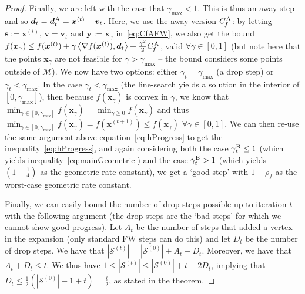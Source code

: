 \documentclass{article} %
\newcommand{\domain}{\mathcal{M}} %
\newcommand{\stepsize}{\gamma}
\newcommand{\stepbound}{\stepsize^\textnormal{\scriptsize B}} %
\newcommand{\away}{{\hspace{0.06em}\textnormal{\scriptsize A}}}
\newcommand{\CfAFW}{C_{\hspace{-0.08em}f}^\away}
\newcommand{\x}{\bm{x}}
\newcommand{\y}{\bm{y}}
\newcommand{\s}{\bm{s}}
\newcommand{\dd}{\bm{d}}
\newcommand{\vv}{\bm{v}} %
\newcommand{\Coreset}{\mathcal{S}}
\newcommand{\0}{\mathbf{0}} %
\begin{document}
\begin{proof}
Finally, we are left with the case that $\stepsize_\textrm{max} < 1$. This is
thus an away step and so $\dd_t = \dd_t^\away = \x^{(t)} - \vv_t$. Here, we
use the away version $\CfAFW$: by letting $\s := \x^{(t)}$, $\vv = \vv_t$ and $\y := \x_\stepsize$ in~\eqref{eq:CfAFW}, we also
get the bound $f(\x_\stepsize) \leq f(\x^{(t)}) + \stepsize \left\langle 
\nabla f(\x^{(t)}), \dd_t \right\rangle + \frac{\stepsize^2}{2} \CfAFW$,
valid $\forall \stepsize \in [0,1]$ (but note here that the points
$\x_\stepsize$ are not feasible for $\stepsize > \stepsize_\textrm{max}$ --
the bound considers some points outside of $\domain$). We now have two
options: either $\stepsize_t = \stepsize_\textrm{max}$ (a drop step) or
$\stepsize_t < \stepsize_\textrm{max}$. In the case $\stepsize_t <
\stepsize_\textrm{max}$ (the line-search yields a solution in the interior of
$[0,\stepsize_\textrm{max}]$), then because $f(\x_\stepsize)$ is convex in
$\stepsize$, we know that $\min_{\stepsize \in [0,\stepsize_\textrm{max}]}
f(\x_\stepsize) = \min_{\stepsize \geq 0} f(\x_\stepsize)$ and thus
$\min_{\stepsize \in [0,\stepsize_\textrm{max}]} f(\x_\stepsize) =
f(\x^{(t+1)}) \leq f(\x_\stepsize)$ $\forall \stepsize \in [0,1]$. We can
then re-use the same argument above equation~\eqref{eq:hProgress} to get the
inequality~\eqref{eq:hProgress}, and again considering both the case
$\stepbound_t \leq 1$ (which yields inequality~\eqref{eq:mainGeometric}) and
the case $\stepbound_t > 1$ (which yields $(1-\frac{1}{4})$ as the geometric
rate constant), we get a `good step' with $1-\rho_f$ as the worst-case
geometric rate constant.

Finally, we can easily bound the number of drop steps possible up to
iteration $t$ with the following argument (the drop steps are the `bad steps'
for which we cannot show good progress). Let $A_t$ be the number of steps
that added a vertex in the expansion (only standard FW steps can do this) and
let $D_t$ be the number of drop steps. We have that $|\Coreset^{(t)}| =
|\Coreset^{(0)}| + A_t - D_t$. Moreover, we have that $A_t+D_t \leq t$. We
thus have $1 \leq |\Coreset^{(t)}| \leq |\Coreset^{(0)}| + t - 2D_t$,
implying that $D_t \leq \frac{1}{2}( |\Coreset^{(0)}|-1+t)=\frac{t}{2}$, as stated in the theorem.
%
%
%
%
%
%
%
%
%
%
%
%
%
%
%
%
%
%
%
%
%
%


\end{proof}
\end{document}
